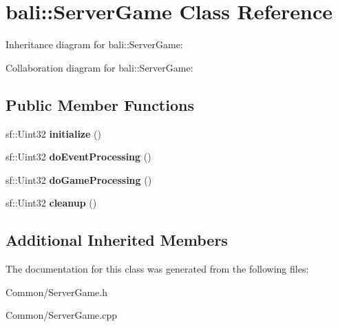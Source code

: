 \hypertarget{classbali_1_1_server_game}{\section{bali\-:\-:Server\-Game Class Reference}
\label{classbali_1_1_server_game}
}


Inheritance diagram for bali\-:\-:Server\-Game\-:


Collaboration diagram for bali\-:\-:Server\-Game\-:
\subsection*{Public Member Functions}
\begin{DoxyCompactItemize}
\item 
\hypertarget{classbali_1_1_server_game_a6b53c2ffd3b66ac40b850aab5146deeb}{sf\-::\-Uint32 {\bfseries initialize} ()}\label{classbali_1_1_server_game_a6b53c2ffd3b66ac40b850aab5146deeb}

\item 
\hypertarget{classbali_1_1_server_game_a74dd6756d65beabc9fc58c4166321088}{sf\-::\-Uint32 {\bfseries do\-Event\-Processing} ()}\label{classbali_1_1_server_game_a74dd6756d65beabc9fc58c4166321088}

\item 
\hypertarget{classbali_1_1_server_game_aa6d4b28ec73aa088ae66791b97959f7a}{sf\-::\-Uint32 {\bfseries do\-Game\-Processing} ()}\label{classbali_1_1_server_game_aa6d4b28ec73aa088ae66791b97959f7a}

\item 
\hypertarget{classbali_1_1_server_game_a1b8f8a31389e93ee3447766f6c43c78a}{sf\-::\-Uint32 {\bfseries cleanup} ()}\label{classbali_1_1_server_game_a1b8f8a31389e93ee3447766f6c43c78a}

\end{DoxyCompactItemize}
\subsection*{Additional Inherited Members}


The documentation for this class was generated from the following files\-:\begin{DoxyCompactItemize}
\item 
Common/Server\-Game.\-h\item 
Common/Server\-Game.\-cpp\end{DoxyCompactItemize}
